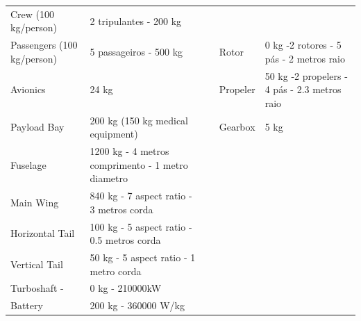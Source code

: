 \begin{table}[h]
\begin{adjustbox}{width=1\textwidth}
\begin{tabular}{|l|l|lll}
\cline{1-2}
Crew (100 kg/person)       & 2 tripulantes - 200 kg                            &                       &                               &                                                                   \\ \cline{1-2} \cline{4-5} 
Passengers (100 kg/person) & 5 passageiros - 500 kg                            & \multicolumn{1}{l|}{} & \multicolumn{1}{l|}{Rotor}    & \multicolumn{1}{l|}{0 kg -2 rotores - 5 pás - 2 metros raio}      \\ \cline{1-2} \cline{4-5} 
Avionics                   & 24 kg                                             & \multicolumn{1}{l|}{} & \multicolumn{1}{l|}{Propeler} & \multicolumn{1}{l|}{50 kg -2 propelers - 4 pás - 2.3 metros raio} \\ \cline{1-2} \cline{4-5} 
Payload Bay                & 200 kg (150 kg medical equipment)                 & \multicolumn{1}{l|}{} & \multicolumn{1}{l|}{Gearbox}  & \multicolumn{1}{l|}{5 kg}                                         \\ \cline{1-2} \cline{4-5} 
Fuselage                   & 1200 kg - 4 metros comprimento - 1 metro diametro &                       &                               &                                                                   \\ \cline{1-2}
Main Wing                  & 840 kg - 7 aspect ratio - 3 metros corda          &                       &                               &                                                                   \\ \cline{1-2}
Horizontal Tail            & 100 kg - 5 aspect ratio - 0.5 metros corda        &                       &                               &                                                                   \\ \cline{1-2}
Vertical Tail              & 50 kg - 5 aspect ratio - 1 metro corda            &                       &                               &                                                                   \\ \cline{1-2}
Turboshaft -               & 0 kg - 210000kW                                   &                       &                               &                                                                   \\ \cline{1-2}
Battery                    & 200 kg - 360000 W/kg                              &                       &                               &                                                                   \\ \cline{1-2}

\end{tabular}
\end{adjustbox}
\end{table}

